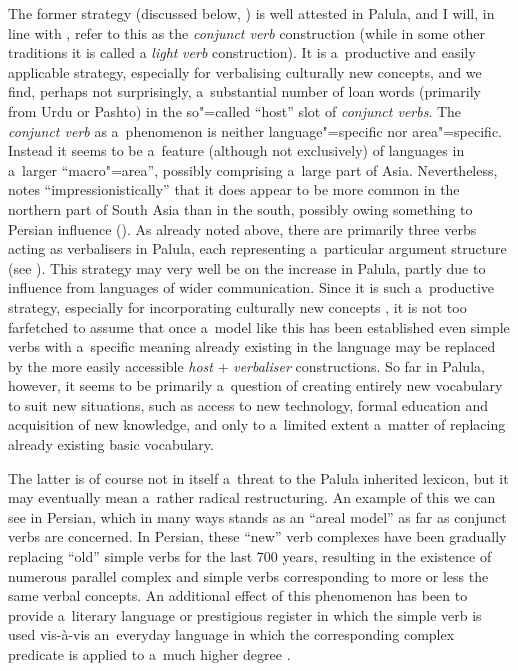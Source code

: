 The former strategy (discussed below, ) is well attested in Palula, and I will, in line with \citet[326]{masica1991}, refer to this as the \textit{conjunct verb} construction (while in some other traditions it is called a \textit{light} \textit{verb} construction). It is a~productive and easily applicable strategy, especially for verbalising culturally new concepts, and we find, perhaps not surprisingly, a~substantial number of loan words (primarily from Urdu or Pashto) in the so"=called ``host'' slot of \textit{conjunct verbs}. The \textit{conjunct verb} as a~phenomenon is neither language"=specific nor area"=specific. Instead it seems to be a~feature (although not exclusively) of languages in a~larger ``macro"=area'', possibly comprising a~large part of Asia. Nevertheless, \citeauthor{masica1991} notes ``impressionistically'' that it does appear to be more common in the northern part of South Asia than in the south, possibly owing something to Persian influence (\citeyear[368]{masica1991}). As already noted above, there are primarily three verbs acting as verbalisers in Palula, each representing a~particular argument structure (see ). This strategy may very well be on the increase in Palula, partly due to influence from languages of wider communication. Since it is such a~productive strategy, especially for incorporating culturally new concepts \citep[85]{gambhir1993}, it is not too farfetched to assume that once a~model like this has been established even simple verbs with a~specific meaning already existing in the language may be replaced by the more easily accessible \textit{host} + \textit{verbaliser} constructions. So far in Palula, however, it seems to be primarily a~question of creating entirely new vocabulary to suit new situations, such as access to new technology, formal education and acquisition of new knowledge, and only to a~limited extent a~matter of replacing already existing basic vocabulary. 



The latter is of course not in itself a~threat to the Palula inherited lexicon, but it may eventually mean a~rather radical restructuring. An example of this we can see in Persian, which in many ways stands as an ``areal model'' as far as conjunct verbs are concerned. In Persian, these ``new'' verb complexes have been gradually replacing ``old'' simple verbs for the last 700 years, resulting in the existence of numerous parallel complex and simple verbs corresponding to more or less the same verbal concepts. An additional effect of this phenomenon has been to provide a~literary language or prestigious register in which the simple verb is used vis-à-vis an~everyday language in which the corresponding complex predicate is applied to a~much higher degree \citep[1369]{follietal2005}. 




